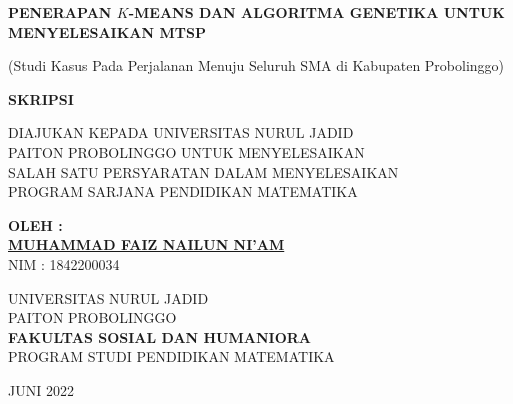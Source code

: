 \begin{center}

\textbf{PENERAPAN $K$-MEANS DAN ALGORITMA GENETIKA UNTUK MENYELESAIKAN MTSP}
       
       (Studi Kasus Pada Perjalanan Menuju Seluruh SMA di Kabupaten Probolinggo) 
       
       \vfill
       \textbf{SKRIPSI}
       \vfill
       
       DIAJUKAN KEPADA UNIVERSITAS NURUL JADID \\
       PAITON PROBOLINGGO UNTUK MENYELESAIKAN \\ SALAH SATU PERSYARATAN DALAM MENYELESAIKAN \\ PROGRAM SARJANA PENDIDIKAN MATEMATIKA
       
       \vfill       
       
       \textbf{OLEH :}\\
       \textbf{\underline{MUHAMMAD FAIZ NAILUN NI'AM}}\\
       NIM : 1842200034

       \vfill
       
       UNIVERSITAS NURUL JADID\\
       PAITON PROBOLINGGO\\
     \textbf{FAKULTAS SOSIAL DAN HUMANIORA}\\       
       PROGRAM STUDI PENDIDIKAN MATEMATIKA\\
       
       \vfill       
       
       JUNI 2022
       
   \end{center}